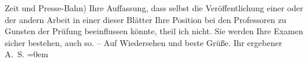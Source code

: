 \begin{ledgroupsized}[t]{13cm}
                  Zeit und Presse-Bahn) Ihre Auffassung, dass \introOben{}selbst\introOben{} die
               Veröffentlichung einer oder der andern Arbeit in einer dieser Blätter Ihre Position
               bei den Professoren zu Gunsten der Prüfung beeinflussen könnte, theil ich nicht. Sie
               werden Ihre {\pb}Examen sicher bestehen, auch so.\pend
           \pstart
           – Auf Wiedersehen und beste Grüße. Ihr ergebener{\\[\baselineskip]}\spacefill\mbox{A. S.}\pend
           \leftskip=0em{}
         
         \endnumbering{}\end{ledgroupsized}  \newcommand{\dateiname}{L01854}\newcommand{\titel}{Arthur Schnitzler an Albert Ehrenstein, 7. 7. 1909}\newcommand{\editorInnen}{Martin Anton Müller und Gerd-Hermann Susen}
      